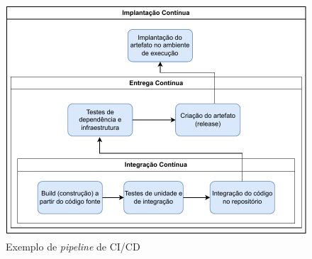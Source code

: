 \begin{figure}[htb]
	\caption{\label{figura-ci-cd}Exemplo de \emph{pipeline} de CI/CD}
	\begin{center}
	    \includegraphics[scale=1]{Imagens/CICD.drawio.pdf}
	\end{center}
\end{figure}



